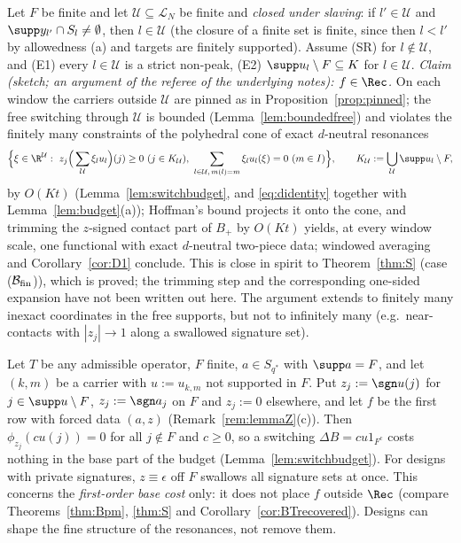 \begin{remark}\label{rem:thmM}
Let $F$ be finite and let $\mathcal U\subseteq\mathcal L_N$ be finite and
\emph{closed under slaving}: if $l'\in\mathcal U$ and $\supp y_{l'}\cap
S_l\ne\emptyset$, then $l\in\mathcal U$ (the closure of a finite set is
finite, since then $l<l'$ by allowedness (a) and targets are finitely
supported).  Assume \textup{(SR)} for $l\notin\mathcal U$, and
(E1) every $l\in\mathcal U$ is a strict non-peak, (E2) $\supp u_l\setminus
F\subseteq K$ for $l\in\mathcal U$.  \emph{Claim (sketch; an argument of
the referee of the underlying notes): $f\in\Rec$.}  On each window the
carriers outside $\mathcal U$ are pinned as in
Proposition~\ref{prop:pinned}; the free switching through $\mathcal U$ is
bounded (Lemma~\ref{lem:boundedfree}) and violates the finitely many
constraints of the polyhedral cone of exact $d$-neutral resonances
\[
 \Big\{\xi\in\R^{\mathcal U}:\ z_j\Big(\sum_{\mathcal U}\xi_lu_l\Big)(j)\ge0\
 (j\in K_{\mathcal U}),\ \sum_{l\in\mathcal U,\,m(l)=m}\xi_lu_l(\xi)=0\
 (m\in I)\Big\},\qquad K_{\mathcal U}:=\bigcup_{\mathcal U}\supp u_l
 \setminus F,
\]
by $O(Kt)$ (Lemma~\ref{lem:switchbudget}, and \eqref{eq:didentity} together
with Lemma~\ref{lem:budget}(a)); Hoffman's bound projects it onto the cone,
and trimming the $z$-signed contact part of $B_+$ by $O(Kt)$ yields, at
every window scale, one functional with exact $d$-neutral two-piece data;
windowed averaging and Corollary~\ref{cor:D1} conclude.  This is close in
spirit to Theorem~\ref{thm:S} (case ($\mathcal B_{\rm fin}$)), which is
proved; the trimming step and the corresponding one-sided expansion have
not been written out here.  The argument extends to finitely many inexact
coordinates in the free supports, but not to infinitely many
(e.g.\ near-contacts with $|z_j|\to1$ along a swallowed signature set).
\end{remark}

\begin{remark}\label{rem:nodesign}
Let $T$ be any admissible operator, $F$ finite, $a\in S_{q^*}$ with
$\supp a=F$, and let $(k,m)$ be a carrier with $u:=u_{k,m}$ not supported
in $F$.  Put $z_j:=\sgn u(j)$ for $j\in\supp u\setminus F$, $z_j:=\sgn a_j$
on $F$ and $z_j:=0$ elsewhere, and let $f$ be the first row with forced
data $(a,z)$ (Remark~\ref{rem:lemmaZ}(c)).  Then $\phi_{z_j}(cu(j))=0$ for
all $j\notin F$ and $c\ge0$, so a switching $\Delta B=cu1_{F^c}$ costs
nothing in the base part of the budget (Lemma~\ref{lem:switchbudget}).  For
designs with private signatures, $z\equiv\epsilon$ off $F$ swallows all
signature sets at once.  This concerns the \emph{first-order base cost}
only: it does not place $f$ outside $\Rec$ (compare
Theorems~\ref{thm:Bpm}, \ref{thm:S} and Corollary~\ref{cor:BTrecovered}).
Designs can shape the fine structure of the resonances, not remove them.
\end{remark}

